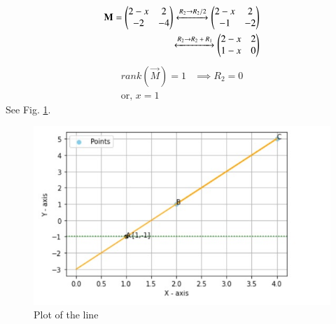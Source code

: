 \begin{align}
 \mathbf{M} = \begin{pmatrix}2-x & 2\\-2 & -4\end{pmatrix}
 \xleftrightarrow{\text{$R_2$}\rightarrow{\text{$R_2/2$}}} 
 \begin{pmatrix}2-x & 2 \\-1 & -2\end{pmatrix}\\
 \xleftrightarrow{\text{$R_2$}\rightarrow{\text{$R_2 + R_1$}}}
 \begin{pmatrix}2-x & 2 \\1-x & 0\end{pmatrix}
\end{align}
\begin{align}
 rank(\vec{M}) = 1 &\implies  R_2 =0 \\
 \text{or, }
            x=1
\end{align}
See Fig.          \ref{aug/2/9/plot}.
\begin{figure}[!h]
         \centering
         \includegraphics[width=\columnwidth]{solutions/aug/2/9/figures/figure.jpeg}
         \caption{Plot of the line }
         \label{aug/2/9/plot}
\end{figure}



